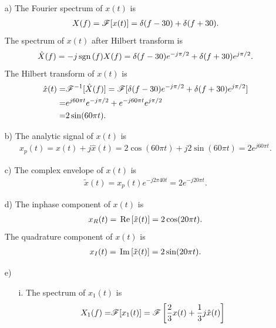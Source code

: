 \documentclass{assignment}
\begin{document}
\begin{sol}
    \begin{itemize}
        \item[a)] The Fourier spectrum of $x(t)$ is
        \begin{align}
            \notag X(f)=\mathscr{F}[x(t)]=\delta(f-30)+\delta(f+30).
        \end{align}
        The spectrum of $x(t)$ after Hilbert transform is
        \begin{align}
            \hat{X}(f)=-j\,\text{sgn}\,(f)X(f)=\delta(f-30)e^{-j\pi/2}+\delta(f+30)e^{j\pi/2}.
        \end{align}
        The Hilbert transform of $x(t)$ is
        \begin{align}
            \notag\hat{x}(t)=&\mathscr{F}^{-1}[\hat{X}(f)]=\mathscr{F}[\delta(f-30)e^{-j\pi/2}+\delta(f+30)e^{j\pi/2}]\\
            \notag=&e^{j60\pi t}e^{-j\pi/2}+e^{-j60\pi t}e^{j\pi/2}\\
            =&2\sin(60\pi t).
        \end{align}
        \item[b)] The analytic signal of $x(t)$ is
        \begin{align}
            x_p(t)=x(t)+j\hat{x}(t)=2\cos(60\pi t)+j2\sin(60\pi t)=2e^{j60\pi t}.
        \end{align}
        \item[c)] The complex envelope of $x(t)$ is
        \begin{align}
            \tilde{x}(t)=x_p(t)e^{-j2\pi 40t}=2e^{-j20\pi t}.
        \end{align}
        \item[d)] The inphase component of $x(t)$ is
        \begin{align}
            x_R(t)=\,\text{Re}\,[\tilde{x}(t)]=2\cos(20\pi t).
        \end{align}
        The quadrature component of $x(t)$ is
        \begin{align}
            x_I(t)=\,\text{Im}\,[\tilde{x}(t)]=2\sin(20\pi t).
        \end{align}
        \item[e)] 
        \begin{itemize}
            \item[i.] The spectrum of $x_1(t)$ is
            \begin{align}
                \notag X_1(f)=&\mathscr{F}[x_1(t)]=\mathscr{F}\left[\frac{2}{3}x(t)+\frac{1}{3}j\hat{x}(t)\right]\\

\end{align}
\end{itemize}
\end{itemize}
\end{sol}
\end{document}
